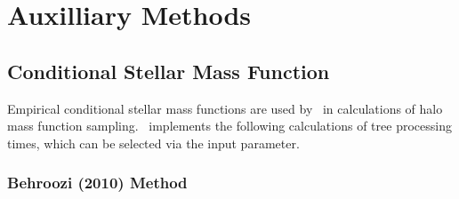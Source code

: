 \chapter{Auxilliary Methods}

\section{Conditional Stellar Mass Function}

Empirical conditional stellar mass functions are used by \glc\ in calculations of halo mass function sampling. \glc\ implements the following calculations of tree processing times, which can be selected via the {\normalfont \ttfamily [conditionalStellarMassFunctionMethod]} input parameter.

\subsection{Behroozi (2010) Method}

